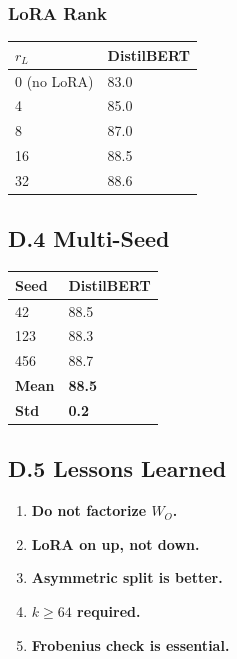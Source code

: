 \subsubsection{LoRA Rank}

\begin{table}[H]
\centering
\small
\begin{tabular}{ll}
\toprule
\textbf{$r_L$} & \textbf{DistilBERT} \\
\midrule
0 (no LoRA) & 83.0 \\
4 & 85.0 \\
8 & 87.0 \\
16 & 88.5 \\
32 & 88.6 \\
\bottomrule
\end{tabular}
\end{table}

\subsection{D.4 Multi-Seed}

\begin{table}[H]
\centering
\small
\begin{tabular}{ll}
\toprule
\textbf{Seed} & \textbf{DistilBERT} \\
\midrule
42 & 88.5 \\
123 & 88.3 \\
456 & 88.7 \\
\textbf{Mean} & \textbf{88.5} \\
\textbf{Std} & \textbf{0.2} \\
\bottomrule
\end{tabular}
\end{table}

\subsection{D.5 Lessons Learned}

\begin{enumerate}
\item \textbf{Do not factorize $W_O$.}
\item \textbf{LoRA on up, not down.}
\item \textbf{Asymmetric split is better.}
\item \textbf{$k \geq 64$ required.}
\item \textbf{Frobenius check is essential.}

\end{enumerate}
